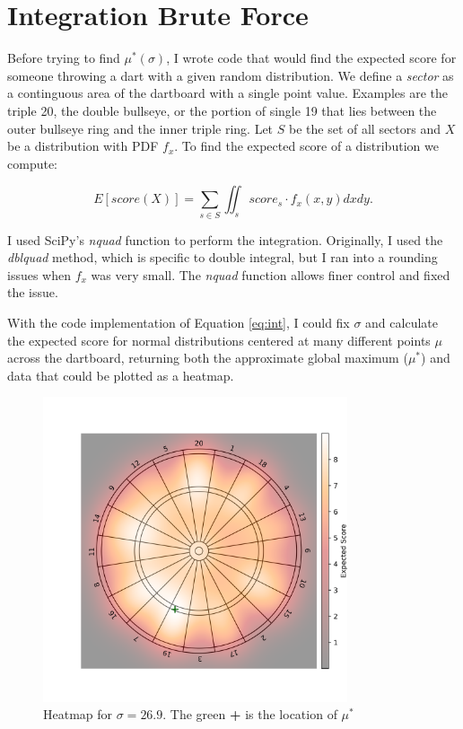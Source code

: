 \documentclass[]{article}
\newcommand{\mustar}{\ensuremath{\mu^* }}
\begin{document}
\section{Integration Brute Force}
Before trying to find $\mu^*(\sigma)$, I wrote code that would find the expected score for someone throwing a dart with a given random distribution. We define a \textit{sector} as a continguous area of the dartboard with a single point value. Examples are the triple 20, the double bullseye, or the portion of single 19 that lies between the outer bullseye ring and the inner triple ring. Let $S$ be the set of all sectors and $X$ be a distribution with PDF $f_x$. To find the expected score of a distribution we compute:



\begin{equation}
	E[score(X)] = \sum_{s \in S} \iint_{s} score_s \cdot  f_x(x, y)  dxdy.
	\label{eq:int}
\end{equation}

I used SciPy's \textit{nquad} function to perform the integration. Originally, I used the \textit{dblquad} method, which is specific to double integral, but I ran into a rounding issues when $f_x$ was very small. The \textit{nquad} function allows finer control and fixed the issue. 

With the code implementation of Equation \ref{eq:int}, I could fix $\sigma$ and calculate the expected score for normal distributions centered at many different points $\mu$ across the dartboard, returning both the approximate global maximum ($\mu^*$) and data that could be plotted as a heatmap.

\begin{figure}[h]
	\centering
	\includegraphics[width=0.8\textwidth]{../images/gist_hear.png}
	\caption{Heatmap for $\sigma = 26.9$. The green \textbf{+} is the location of  \mustar}
	\label{fig:basicheatmap}
\end{figure}
\end{document}

